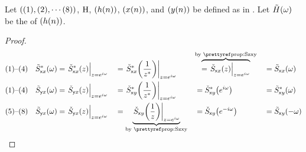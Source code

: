 \begin{corollary}
\label{cor:Swxx_real}
\label{cor:Swxy}
Let $\left((1), (2),\cdots (8)\right)$, $\operatorname{H}$, $\left({h}(n)\right)$, $\left(x(n)\right)$, and $\left(y(n)\right)$
be defined as in .
Let ${{\tilde{{H}}}}(\omega)$ be the   of $\left({h}(n)\right)$.
\end{corollary}
\begin{proof}
\begin{align*}
  \text{(1)--(4)}\quad\Swxx^\ast(\omega)
    &= \brlr{\Szxx^\ast\brp{z}}_{z=e^{i\omega}}
   &&= \brlr{\Szxx^\ast\brp{\frac{1}{z^\ast}}}_{z=e^{i\omega}}
   && \ocom{=\brlr{\Szxx\brp{z}}_{z=e^{i\omega}}}{by \pref{prop:Szxy}}
   &&= \Swxx(\omega)
  \\
  \text{(1)--(4)}\quad\Swyx(\omega)
    &= \brlr{\Szyx\brp{z}}_{z=e^{i\omega}}
   &&= \brlr{\Szxy^\ast\brp{\frac{1}{z^\ast}}}_{z=e^{i\omega}}
   &&= \Szxy^\ast\brp{e^{i\omega}}
   &&= \Swxy^\ast(\omega)
  \\
  \text{(5)--(8)}\quad\Swyx(\omega)
    &= \brlr{\Szyx\brp{z}}_{z=e^{i\omega}}
   &&= \mcom{\brlr{\Szxy\brp{\frac{1}{z}}}_{z=e^{i\omega}}}{by \pref{prop:Szxy}}
   &&= \Szxy\brp{e^{-i\omega}}
   &&= \Swxy(-\omega)
\end{align*}
\end{proof}

